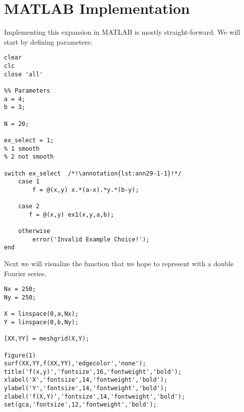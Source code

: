 \section{MATLAB Implementation}
Implementing this expansion in MATLAB is mostly straight-forward.  We will start by defining parameters:
\begin{lstlisting}[name=lec29-ex1, style=myMatlab]
clear
clc
close 'all'

%% Parameters
a = 4;
b = 3;

N = 20;

ex_select = 1;
% 1 smooth
% 2 not smooth

switch ex_select  /*!\annotation{lst:ann29-1-1}!*/
    case 1
        f = @(x,y) x.*(a-x).*y.*(b-y);
        
    case 2
       f = @(x,y) ex1(x,y,a,b);
       
    otherwise
        error('Invalid Example Choice!');
end
\end{lstlisting}

Next we will visualize the function that we hope to represent with a double Fourier series.

\begin{lstlisting}[name=lec29-ex1,style=myMatlab]
Nx = 250;
Ny = 250;

X = linspace(0,a,Nx);
Y = linspace(0,b,Ny);

[XX,YY] = meshgrid(X,Y);

figure(1)
surf(XX,YY,f(XX,YY),'edgecolor','none');
title('f(x,y)','fontsize',16,'fontweight','bold');
xlabel('X','fontsize',14,'fontweight','bold');
ylabel('Y','fontsize',14,'fontweight','bold');
zlabel('f(X,Y)','fontsize',14,'fontweight','bold');
set(gca,'fontsize',12,'fontweight','bold');


\end{lstlisting}


